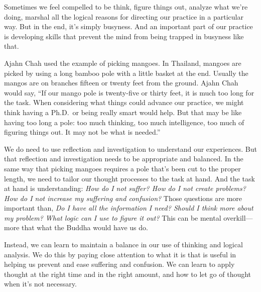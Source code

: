 
Sometimes we feel compelled to be think, figure things out, analyze 
what we're doing, marshal all the logical reasons for directing our 
practice in a particular way. But in the end, it's simply busyness. And 
an important part of our practice is developing skills that prevent the 
mind from being trapped in busyness like that.

Ajahn Chah used the example of picking mangoes. In Thailand, mangoes 
are picked by using a long bamboo pole with a little basket at the end. 
Usually the mangos are on branches fifteen or twenty feet from the 
ground. Ajahn Chah would say, ``If our mango pole is twenty-five or 
thirty feet, it is much too long for the task. When considering what 
things could advance our practice, we might think having a Ph.D. or 
being really smart would help. But that may be like having too long a 
pole: too much thinking, too much intelligence, too much of figuring 
things out. It may not be what is needed.''

We do need to use reflection and investigation to understand our 
experiences. But that reflection and investigation needs to be 
appropriate and balanced. In the same way that picking mangoes requires 
a pole that's been cut to the proper length, we need to tailor our 
thought processes to the task at hand. And the task at hand is 
understanding: \emph{How do I not suffer? How do I not create problems? 
How do I not increase my suffering and confusion?} Those questions are 
more important than, \emph{Do I have all the information I need? Should 
I think more about my problem? What logic can I use to figure it out?} 
This can be mental overkill---more that what the Buddha would have us 
do.

Instead, we can learn to maintain a balance in our use of thinking and 
logical analysis. We do this by paying close attention to what it is 
that is useful in helping us prevent and ease suffering and confusion. 
We can learn to apply thought at the right time and in the right 
amount, and how to let go of thought when it's not necessary.

